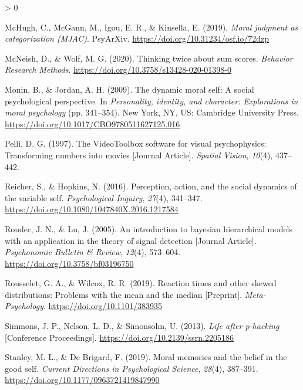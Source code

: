 \documentclass[
  english,
  man]{apa6}
\newlength{\cslhangindent}
\newenvironment{CSLReferences}[2] %
 {%
  \setlength{\parindent}{0pt}
  \ifodd #1 \everypar{\setlength{\hangindent}{\cslhangindent}}\ignorespaces\fi
  \ifnum #2 > 0
  \setlength{\parskip}{#2\baselineskip}
  \fi
 }%
 {}
\begin{document}
\begin{CSLReferences}{1}{0}
\leavevmode\hypertarget{ref-mchugh_moral_2019}{}%
McHugh, C., McGann, M., Igou, E. R., \& Kinsella, E. (2019). \emph{Moral judgment as categorization ({MJAC})}. {PsyArXiv}. \url{https://doi.org/10.31234/osf.io/72dzp}

\leavevmode\hypertarget{ref-mcneish_thinking_2020}{}%
McNeish, D., \& Wolf, M. G. (2020). Thinking twice about sum scores. \emph{Behavior Research Methods}. \url{https://doi.org/10.3758/s13428-020-01398-0}

\leavevmode\hypertarget{ref-monin_dynamic_2009}{}%
Monin, B., \& Jordan, A. H. (2009). The dynamic moral self: A social psychological perspective. In \emph{Personality, identity, and character: Explorations in moral psychology} (pp. 341--354). New York, {NY}, {US}: Cambridge University Press. \url{https://doi.org/10.1017/CBO9780511627125.016}

\leavevmode\hypertarget{ref-Pelli_1997}{}%
Pelli, D. G. (1997). The VideoToolbox software for visual psychophysics: Transforming numbers into movies {[}Journal Article{]}. \emph{Spatial Vision}, \emph{10}(4), 437--442.

\leavevmode\hypertarget{ref-reicher_perception_2016}{}%
Reicher, S., \& Hopkins, N. (2016). Perception, action, and the social dynamics of the variable self. \emph{Psychological Inquiry}, \emph{27}(4), 341--347. \url{https://doi.org/10.1080/1047840X.2016.1217584}

\leavevmode\hypertarget{ref-Rouder_2005_BHM_SDT}{}%
Rouder, J. N., \& Lu, J. (2005). An introduction to bayesian hierarchical models with an application in the theory of signal detection {[}Journal Article{]}. \emph{Psychonomic Bulletin \& Review}, \emph{12}(4), 573--604. \url{https://doi.org/10.3758/bf03196750}

\leavevmode\hypertarget{ref-Rousselet_2019}{}%
Rousselet, G. A., \& Wilcox, R. R. (2019). Reaction times and other skewed distributions: Problems with the mean and the median {[}Preprint{]}. \emph{Meta-Psychology}. \url{https://doi.org/10.1101/383935}

\leavevmode\hypertarget{ref-Simmons_2013_life}{}%
Simmons, J. P., Nelson, L. D., \& Simonsohn, U. (2013). \emph{Life after p-hacking} {[}Conference Proceedings{]}. \url{https://doi.org/10.2139/ssrn.2205186}

\leavevmode\hypertarget{ref-stanley_moral_2019}{}%
Stanley, M. L., \& De Brigard, F. (2019). Moral memories and the belief in the good self. \emph{Current Directions in Psychological Science}, \emph{28}(4), 387--391. \url{https://doi.org/10.1177/0963721419847990}


\end{CSLReferences}
\end{document}
